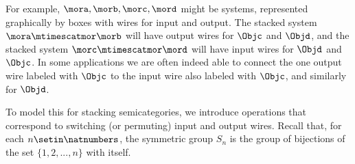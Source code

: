 For example, $\mora, \morb, \morc, \mord$ might be systems, represented graphically by boxes with wires for input and output.
The stacked system $\mora \mtimescatmor \morb$ will have output wires for $\Objc$ and $\Objd$, and the stacked system $\morc \mtimescatmor \mord$ will have input wires for $\Objd$ and $\Objc$.
In some applications we are often indeed able to connect the one output wire labeled with $\Objc$ to the input wire also labeled with $\Objc$, and similarly for $\Objd$.

To model this for stacking semicategories, we introduce operations that correspond to switching (or permuting) input and output wires.
Recall that, for each $n \setin \natnumbers$, the symmetric group $S_n$ is the group of bijections of the set $\{1, 2, .
    .., n \}$ with itself.


